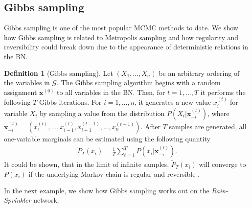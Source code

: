 \documentclass[a4paper, twoside, 11pt]{report}
\newcommand{\bfx}{{\mathbf{x}}}
\theoremstyle{plain}
\theoremstyle{definition}
\newtheorem{definition}[thm]{Definition}
\theoremstyle{remark}
\newcommand{\G}{{\mathcal G}}
\begin{document}
\subsection{Gibbs sampling}
Gibbs sampling \cite{geman1984stochastic} is one of the most popular MCMC methods to date.  We show how Gibbs sampling is related to Metropolis sampling and how regularity and reversibility could break down due to the appearance of deterministic relations in the BN.
\begin{definition}[Gibbs sampling]
Let $(X_1, \ldots , X_n)$ be an arbitrary ordering of the variables in $\G$. The Gibbs sampling algorithm begins with a random assignment $\bfx^{(0)}$ to all variables in the BN. Then, for $t = 1, \ldots, T$ it performs the following $T$ Gibbs iterations. For $i=1, \ldots, n$, it generates a new value $x_i^{(t)}$ for variable $X_i$ by sampling a value from the distribution $P(X_i | \bfx_{-i}^{(t)})$, where $\bfx_{-i}^{(t)} = (x_1^{(t)}, \ldots, x_{i-1}^{(t)}, x_{i+1}^{(t-1)}, \ldots, x_{n}^{(t-1)})$. After $T$ samples are generated, all one-variable marginals can be estimated using the following quantity
\begin{align}\label{eq:gibss}
\widetilde{P}_T(x_i) = \frac{1}{T} \sum_{t=1}^T P(x_i | \bfx_{-i}^{(t)} ).
\end{align}
It could be shown, that in the limit of infinite samples, $\widetilde{P}_T(x_i)$ will converge to $P(x_i)$ if the underlying Markov chain is regular and reversible \cite{venugopal2013giss}.
\end{definition}
In the next example, we show how Gibbs sampling works out on the \textit{Rain-Sprinkler} network.
\end{document}
